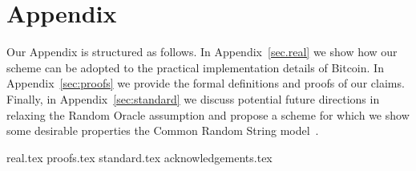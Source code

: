 \section*{Appendix}

Our Appendix is structured as follows. In Appendix~\ref{sec.real} we show how
our scheme can be adopted to the practical implementation details of Bitcoin.
In Appendix~\ref{sec:proofs} we provide the formal definitions and proofs of our
claims. Finally, in Appendix~\ref{sec:standard}
we discuss potential future directions in relaxing the Random Oracle assumption
and propose a scheme for which we show some desirable properties
the Common Random String model~\cite{STOC:BluFelMic88}.

{real.tex}
{proofs.tex}
{standard.tex}
{acknowledgements.tex}
